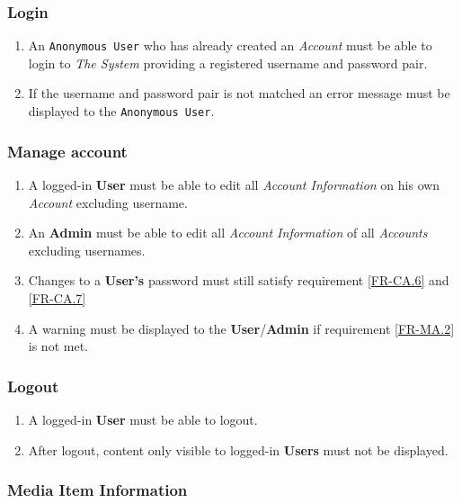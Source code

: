 \subsubsection {Login}
	
\begin{enumerate}[label=\textbf{FR-\twodigits*}, resume]
	\item An \texttt{Anonymous User} who has already created an \textit{Account} must be able to login to \textit{The System} providing a registered username and password pair.
	\item If the username and password pair is not matched an error message must be displayed to the \texttt{Anonymous User}. 
\end{enumerate}
		
\subsubsection {Manage account}

\begin{enumerate}[label=\textbf{FR-\twodigits*}, resume]
	\item A logged-in \textbf{User} must be able to edit all \textit{Account Information} on his own \textit{Account} excluding username.
	\item An \textbf{Admin} must be able to edit all \textit{Account Information} of all \textit{Accounts} excluding usernames.
	\item Changes to a \textbf{User's} password must still satisfy requirement \ref{FR-CA.6} and \ref{FR-CA.7} \label{FR-MA.2}
	\item A warning must be displayed to the \textbf{User}/\textbf{Admin} if requirement \ref{FR-MA.2} is not met.	
\end{enumerate}
		
\subsubsection {Logout}
\begin{enumerate}[label=\textbf{FR-\twodigits*}, resume]
	\item A logged-in \textbf{User} must be able to logout.
	\item After logout, content only visible to logged-in \textbf{Users} must not be displayed.
\end{enumerate}
	
\subsubsection {Media Item Information} \label{FR-Media}

